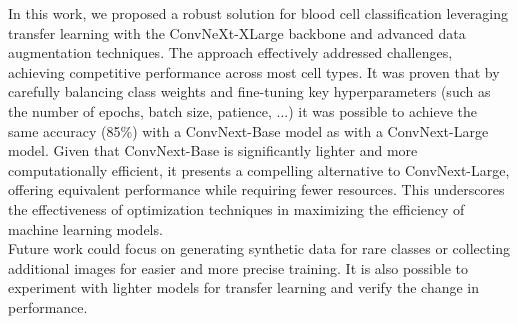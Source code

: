 \documentclass[11pt]{article}
\begin{document}
\begin{multicols}{2}
    In this work, we proposed a robust solution for blood cell classification leveraging transfer learning with the ConvNeXt-XLarge backbone and advanced data augmentation techniques. The approach effectively addressed challenges, achieving competitive performance across most cell types.
    It was proven that by carefully balancing class weights and fine-tuning key hyperparameters (such as the number of epochs, batch size, patience, ...) it was possible to achieve the same accuracy (85\%) with a ConvNext-Base model as with a ConvNext-Large model. Given that ConvNext-Base is significantly lighter and more computationally efficient, it presents a compelling alternative to ConvNext-Large, offering equivalent performance while requiring fewer resources. This underscores the effectiveness of optimization techniques in maximizing the efficiency of machine learning models.
    \\
    Future work could focus on generating synthetic data for rare classes or collecting additional images for easier and more precise training. It is also possible to experiment with lighter models for transfer learning and verify the change in performance.

        


        
        
    
    
    \end{multicols}
\end{document}
